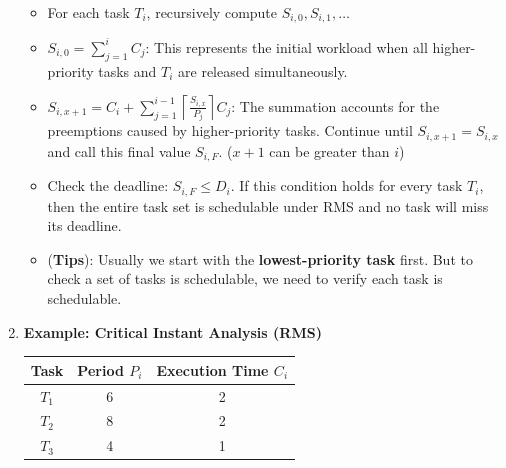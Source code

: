 \documentclass[10pt, landscape]{article}
\begin{document}
\begin{multicols}{4}
\begin{enumerate}
\begin{itemize}
        \item For each task $T_i$, recursively compute $S_{i,0}, S_{i,1}, \ldots$
        \item $S_{i,0} = \sum_{j=1}^{i} C_j$: This represents the initial workload when all higher-priority tasks and $T_i$ are released simultaneously.
        \item $S_{i,x+1} = C_i + \sum_{j=1}^{i-1} \left\lceil \frac{S_{i,x}}{P_j} \right\rceil C_j$: The summation accounts for the preemptions caused by higher-priority tasks. Continue until $S_{i,x+1} = S_{i,x}$ and call this final value $S_{i,F}$. ($x+1$ can be greater than $i$)
        \item Check the deadline: $S_{i,F} \le D_i$. If this condition holds for every task $T_i$, then the entire task set is schedulable under RMS and no task will miss its deadline.
        \item (\textbf{Tips}): Usually we start with the \textbf{lowest-priority task} first. But to check a set of tasks is schedulable, we need to verify each task is schedulable.
    \end{itemize}
    \item \textbf{Example: Critical Instant Analysis (RMS)}
    \begin{tabular}{c|cc}
    \hline
    \textbf{Task} & \textbf{Period }$P_i$ & \textbf{Execution Time }$C_i$ \\
    \hline
    $T_1$ & 6 & 2 \\
    $T_2$ & 8 & 2 \\
    $T_3$ & 4 & 1 \\
    \hline
    \end{tabular}
    

\end{enumerate}
\end{multicols}
\end{document}
